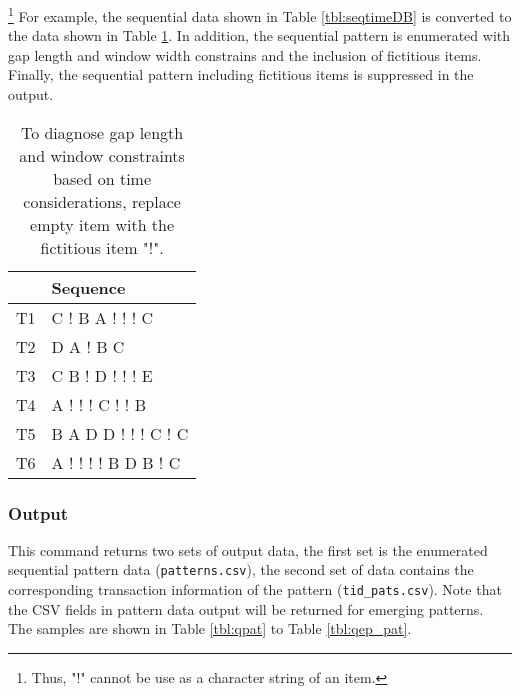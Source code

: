 \footnote{
Thus, "!" cannot be use as a character string of an item.
} 
For example, the sequential data shown in Table \ref{tbl:seqtimeDB} is converted to the data shown in Table \ref{tbl:paddingDB}. In addition, the sequential pattern is enumerated with gap length and window width constrains and the inclusion of fictitious items. Finally, the sequential pattern including fictitious items is suppressed in the output. 

\begin{table}[htbp]
\begin{center}
\caption{To diagnose gap length and window constraints based on time considerations, replace empty item with the fictitious item "!".\label{tbl:paddingDB}}
{\small
\begin{tabular}{cl}
\hline
  &Sequence \\
\hline
T1&C ! B A ! ! ! C\\
T2&D A ! B C\\
T3&C B ! D ! ! ! E\\
T4&A ! ! ! C ! ! B\\
T5&B A D D ! ! ! C ! C\\
T6&A ! ! ! ! B D B ! C\\
\hline
\end{tabular} 
}
\end{center}
\end{table} 

\subsubsection{Output}
This command returns two sets of output data, the first set is the enumerated sequential pattern data (\verb|patterns.csv|), the second set of data contains the corresponding transaction information of the pattern  (\verb|tid_pats.csv|).
Note that the CSV fields in pattern data output  will be returned for emerging patterns. 
The samples are shown in Table \ref{tbl:qpat} to Table \ref{tbl:qep_pat}. \\


